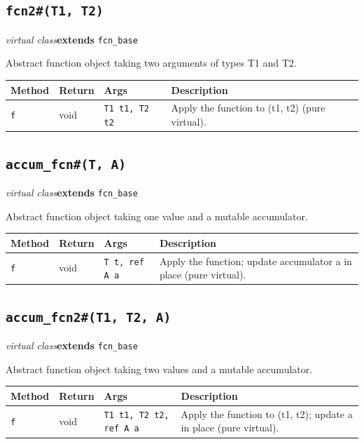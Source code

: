 \documentclass[11pt,letterpaper]{report}
\begin{document}
\subsection*{\texttt{fcn2\#(T1, T2)}}
\noindent\small\textit{virtual class}\quad \textbf{extends} \texttt{fcn\_base}\par

Abstract function object taking two arguments of types T1 and T2.

\begin{xltabular}{\linewidth}{>{\small}p{1.35in} >{\small}p{1.25in} >{\small}p{0.95in} >{\small}X}
\toprule
\textbf{Method} & \textbf{Return} & \textbf{Args} & \textbf{Description} \\
\midrule
\endhead
\bottomrule
\endfoot
\texttt{f} & void & \texttt{T1 t1, T2 t2} & Apply the function to (t1, t2) (pure virtual). \\
\end{xltabular}

\subsection*{\texttt{accum\_fcn\#(T, A)}}
\noindent\small\textit{virtual class}\quad \textbf{extends} \texttt{fcn\_base}\par

Abstract function object taking one value and a mutable accumulator.

\begin{xltabular}{\linewidth}{>{\small}p{1.35in} >{\small}p{1.25in} >{\small}p{0.95in} >{\small}X}
\toprule
\textbf{Method} & \textbf{Return} & \textbf{Args} & \textbf{Description} \\
\midrule
\endhead
\bottomrule
\endfoot
\texttt{f} & void & \texttt{T t, ref A a} & Apply the function; update accumulator a in place (pure virtual). \\
\end{xltabular}

\subsection*{\texttt{accum\_fcn2\#(T1, T2, A)}}
\noindent\small\textit{virtual class}\quad \textbf{extends} \texttt{fcn\_base}\par

Abstract function object taking two values and a mutable accumulator.

\begin{xltabular}{\linewidth}{>{\small}p{1.35in} >{\small}p{1.25in} >{\small}p{0.95in} >{\small}X}
\toprule
\textbf{Method} & \textbf{Return} & \textbf{Args} & \textbf{Description} \\
\midrule
\endhead
\bottomrule
\endfoot
\texttt{f} & void & \texttt{T1 t1, T2 t2, ref A a} & Apply the function to (t1, t2); update a in place (pure virtual). \\
\end{xltabular}
\end{document}
